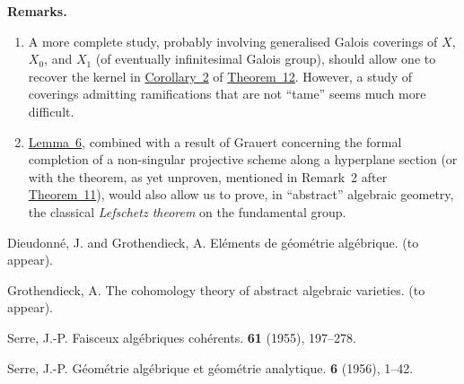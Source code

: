 \documentclass{article}
\newenvironment{rmenv}[1]
  {\phantomsection\par\medskip\noindent\textbf{#1.}\rmfamily}
  {\par\medskip}
\begin{document}
\begin{rmenv}{Remarks}
  \begin{enumerate}[1)]
    \item A more complete study, probably involving generalised Galois coverings of $X$, $X_0$, and $X_1$ (of eventually infinitesimal Galois group), should allow one to recover the kernel in \hyperref[theorem12corollary2]{Corollary~2} of \hyperref[theorem12]{Theorem~12}.
      However, a study of coverings admitting ramifications that are not ``tame'' seems much more difficult.
    \item \hyperref[lemma6]{Lemma~6}, combined with a result of Grauert concerning the formal completion of a non-singular projective scheme along a hyperplane section (or with the theorem, as yet unproven, mentioned in Remark~2 after \hyperref[theorem11]{Theorem~11}), would also allow us to prove, in ``abstract'' algebraic geometry, the classical \emph{Lefschetz theorem} on the fundamental group.
  \end{enumerate}
\end{rmenv}



\nocite{*}
\begin{thebibliography}{4}

  {Dieudonn\'{e}, J. and Grothendieck, A.}
  \newblock El\'{e}ments de g\'{e}om\'{e}trie alg\'{e}brique.
   (to appear).

  {Grothendieck, A.}
  \newblock The cohomology theory of abstract algebraic varieties.
   (to appear).

  {Serre, J.-P.}
  \newblock Faisceux alg\'{e}briques coh\'{e}rents.
   {\bf 61} (1955), 197--278.

  {Serre, J.-P.}
  \newblock G\'{e}om\'{e}trie alg\'{e}brique et g\'{e}om\'{e}trie analytique.
   \textbf{6} (1956), 1--42.

\end{thebibliography}
\end{document}
